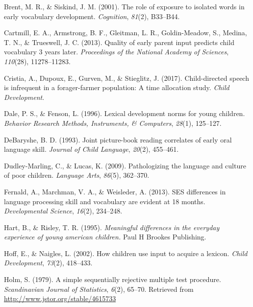 \documentclass[man]{apa6}
\theoremstyle{definition}
\theoremstyle{definition}
\theoremstyle{definition}
\theoremstyle{remark}
\begin{document}
\leavevmode\hypertarget{ref-brent2001role}{}%
Brent, M. R., \& Siskind, J. M. (2001). The role of exposure to isolated
words in early vocabulary development. \emph{Cognition}, \emph{81}(2),
B33--B44.

\leavevmode\hypertarget{ref-cartmill2013quality}{}%
Cartmill, E. A., Armstrong, B. F., Gleitman, L. R., Goldin-Meadow, S.,
Medina, T. N., \& Trueswell, J. C. (2013). Quality of early parent input
predicts child vocabulary 3 years later. \emph{Proceedings of the
National Academy of Sciences}, \emph{110}(28), 11278--11283.

\leavevmode\hypertarget{ref-cristia2017child}{}%
Cristia, A., Dupoux, E., Gurven, M., \& Stieglitz, J. (2017).
Child-directed speech is infrequent in a forager-farmer population: A
time allocation study. \emph{Child Development}.

\leavevmode\hypertarget{ref-dale1996lexical}{}%
Dale, P. S., \& Fenson, L. (1996). Lexical development norms for young
children. \emph{Behavior Research Methods, Instruments, \& Computers},
\emph{28}(1), 125--127.

\leavevmode\hypertarget{ref-debaryshe1993joint}{}%
DeBaryshe, B. D. (1993). Joint picture-book reading correlates of early
oral language skill. \emph{Journal of Child Language}, \emph{20}(2),
455--461.

\leavevmode\hypertarget{ref-dudley2009pathologizing}{}%
Dudley-Marling, C., \& Lucas, K. (2009). Pathologizing the language and
culture of poor children. \emph{Language Arts}, \emph{86}(5), 362--370.

\leavevmode\hypertarget{ref-fernald2013ses}{}%
Fernald, A., Marchman, V. A., \& Weisleder, A. (2013). SES differences
in language processing skill and vocabulary are evident at 18 months.
\emph{Developmental Science}, \emph{16}(2), 234--248.

\leavevmode\hypertarget{ref-hart1995meaningful}{}%
Hart, B., \& Risley, T. R. (1995). \emph{Meaningful differences in the
everyday experience of young american children.} Paul H Brookes
Publishing.

\leavevmode\hypertarget{ref-hoff2002children}{}%
Hoff, E., \& Naigles, L. (2002). How children use input to acquire a
lexicon. \emph{Child Development}, \emph{73}(2), 418--433.

\leavevmode\hypertarget{ref-holm1979simple}{}%
Holm, S. (1979). A simple sequentially rejective multiple test
procedure. \emph{Scandinavian Journal of Statistics}, \emph{6}(2),
65--70. Retrieved from \url{http://www.jstor.org/stable/4615733}
\end{document}
